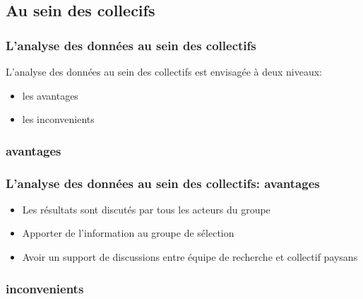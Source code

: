 \subsection{Au sein des collecifs}  

\begin{frame}
\frametitle{L'analyse des données au sein des collectifs}

L'analyse des données au sein des collectifs est envisagée à deux niveaux:

\begin{itemize}
\item les avantages
\item les inconvenients
\end{itemize}

\end{frame}


\subsubsection{avantages}

\begin{frame}
\frametitle{L'analyse des données au sein des collectifs: avantages}

\begin{itemize}
\item Les résultats sont discutés par tous les acteurs du groupe
\item Apporter de l'information au groupe de sélection
\item Avoir un support de discussions entre équipe de recherche et collectif paysans
\end{itemize}

\end{frame}


\subsubsection{inconvenients}

